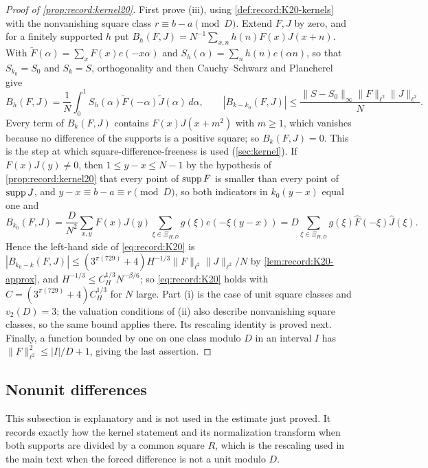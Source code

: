 \begin{proof}[Proof of \cref{prop:record:kernel20}]
First prove (iii), using \cref{def:record:K20-kernels} with the nonvanishing
square class $r\equiv b-a\pmod D$. Extend $F,J$ by zero, and for a finitely
supported $h$ put
$B_h(F,J)=N^{-1}\sum_{x,n}h(n)F(x)J(x+n)$. With
$\widetilde F(\alpha)=\sum_xF(x)e(-x\alpha)$ and
$S_h(\alpha)=\sum_nh(n)e(\alpha n)$, so that $S_{k_0}=S_0$ and $S_k=S$,
orthogonality and then Cauchy--Schwarz and Plancherel give
\[
 B_h(F,J)=\frac1N\int_0^1S_h(\alpha)\widetilde F(-\alpha)\widetilde J(\alpha)\,d\alpha,
 \qquad
 |B_{k-k_0}(F,J)|\le\frac{\|S-S_0\|_\infty\|F\|_{\ell^2}\|J\|_{\ell^2}}N.
\]
Every term of $B_k(F,J)$ contains $F(x)J(x+m^2)$ with $m\ge1$, which vanishes
because no difference of the supports is a positive square; so
$B_k(F,J)=0$. This is the step at which square-difference-freeness is used
(\cref{sec:kernel}). If $F(x)J(y)\ne0$, then $1\le y-x\le N-1$ by the hypothesis of \cref{prop:record:kernel20} that every point of $\operatorname{supp} F$ is smaller than every point of $\operatorname{supp} J$,
and $y-x\equiv b-a\equiv r\pmod D$, so both indicators in $k_0(y-x)$ equal one
and
\[
 B_{k_0}(F,J)=\frac D{N^2}\sum_{x,y}F(x)J(y)\sum_{\xi\in\Xi_{H,D}}g(\xi)
 e(-\xi(y-x))=D\sum_{\xi\in\Xi_{H,D}}g(\xi)\widehat F(-\xi)\widehat J(\xi).
\]
Hence the left-hand side of \eqref{eq:record:K20} is
$|B_{k_0-k}(F,J)|\le(3^{\pi(729)}+4)H^{-1/3}\|F\|_{\ell^2}\|J\|_{\ell^2}/N$ by
\cref{lem:record:K20-approx}, and $H^{-1/3}\le C_H^{1/3}N^{-\beta/6}$; so
\eqref{eq:record:K20} holds with $C=(3^{\pi(729)}+4)C_H^{1/3}$ for $N$ large.
Part (i) is the case of unit square classes and $v_2(D)=3$; the valuation
conditions of (ii) also describe nonvanishing square classes, so the same
bound applies there. Its rescaling identity is proved next. Finally, a
function bounded by one on one class modulo $D$ in an interval $I$ has
$\|F\|_{\ell^2}^2\le|I|/D+1$, giving the last assertion.
\end{proof}

\subsection{Nonunit differences}

This subsection is explanatory and is not used in the estimate
just proved. It records exactly how the kernel statement and its
normalization transform when both supports are divided by a common
square $R$, which is the rescaling used in the main text when the
forced difference is not a unit modulo $D$.

